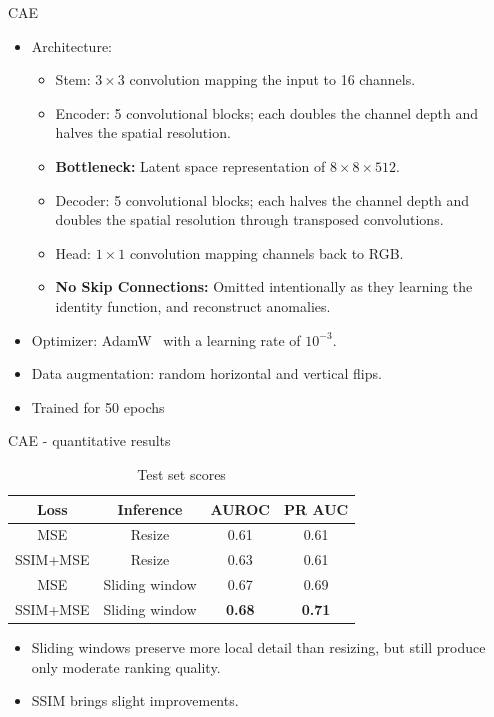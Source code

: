 \documentclass{beamer}
\begin{document}
\begin{frame}{CAE}
    \begin{itemize}
        \item Architecture:
            \begin{itemize}
                \item Stem: $3 \times 3$ convolution mapping the input to 16 channels.
                \item Encoder: 5 convolutional blocks; each doubles the channel depth and halves the spatial resolution.
                \item \textbf{Bottleneck:} Latent space representation of $8 \times 8 \times 512$.
                \item Decoder: 5 convolutional blocks; each halves the channel depth and doubles the spatial resolution through transposed convolutions.
                \item Head: $1 \times 1$ convolution mapping channels back to RGB.
                \item \textbf{No Skip Connections:} Omitted intentionally as they learning the identity function, and reconstruct anomalies.
            \end{itemize}
        \item Optimizer: AdamW~\cite{AdamW} with a learning rate of $10^{-3}$.
        \item Data augmentation: random horizontal and vertical flips.
        \item Trained for 50 epochs
    \end{itemize}
\end{frame}

\begin{frame}{CAE - quantitative results}
    \begin{table}
        \centering
        \footnotesize
        \begin{tabular}{|c|c|c|c|}
        \hline
            Loss & Inference & AUROC & PR AUC\\
        \hline
            MSE & Resize & 0.61 & 0.61\\
        \hline
            SSIM+MSE & Resize & 0.63 & 0.61\\
        \hline
            MSE & Sliding window & 0.67 & 0.69\\
        \hline
            SSIM+MSE & Sliding window & \textbf{0.68} & \textbf{0.71}\\
        \hline
        \end{tabular}
        \caption{Test set scores}
    \end{table}
    \begin{itemize}
        \item Sliding windows preserve more local detail than resizing, but still produce only moderate ranking quality.
        \item SSIM brings slight improvements.
    \end{itemize}
\end{frame}
\end{document}
